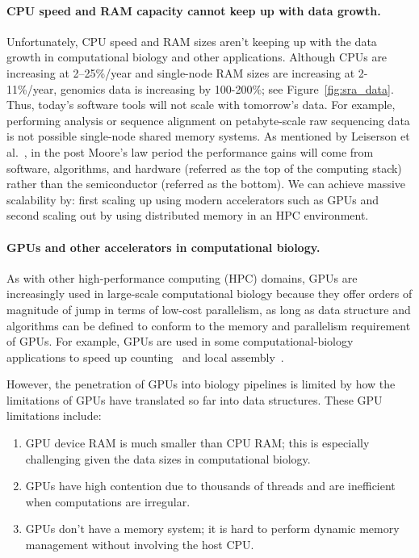 \paragraph{CPU speed and RAM capacity cannot keep up with data growth.}
Unfortunately, CPU speed and RAM sizes aren't keeping up with the data growth in computational biology and other applications.
Although CPUs are increasing at 2--25\%/year and single-node RAM sizes are increasing at 2-11\%/year, genomics data is increasing by 100-200\%; see Figure~\ref{fig:sra_data}.
Thus, today's software tools will not scale with tomorrow's data. For example, performing \kmer analysis or sequence alignment on petabyte-scale raw sequencing data is not possible single-node shared memory systems.
As mentioned by Leiserson et al.~\cite{leiserson2020there}, in the post Moore’s law period the performance gains will come from software, algorithms, and hardware (referred as the top of the computing stack) rather than the semiconductor (referred as the bottom). We can achieve massive scalability by: first scaling up using modern accelerators such as GPUs and second scaling out by using distributed memory in an HPC environment.


\paragraph{GPUs and other accelerators in computational biology.}
As with other high-performance computing (HPC) domains, 
GPUs are increasingly used in large-scale computational biology because they offer orders of magnitude of jump in terms of low-cost parallelism, as long as data structure and algorithms can be defined to conform to the memory and parallelism requirement of GPUs.
%
For example, GPUs are used in some computational-biology applications to speed up \kmer counting~\cite{nisa2021distributed} and local assembly~\cite{awan2021accelerating}.

However, the penetration of GPUs into biology pipelines is limited by how the limitations of GPUs have translated so far into data structures.  These GPU limitations include:
\begin{enumerate}
  \item GPU device RAM is much smaller than CPU RAM; this is especially
    challenging given the data sizes in computational biology.
  \item GPUs have high contention due to thousands of threads and are
    inefficient when computations are irregular.
  \item GPUs don't have a memory system; it is hard to perform dynamic memory management without involving the host CPU.
\end{enumerate}

